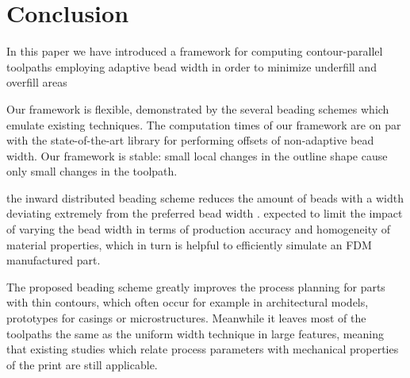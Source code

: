 \section{Conclusion}
In this paper we have introduced a framework for computing contour-parallel toolpaths employing adaptive bead width in order to minimize underfill and overfill areas

Our framework is flexible, demonstrated by the several beading schemes which emulate existing techniques.
The computation times of our framework are on par with the state-of-the-art library for performing offsets of non-adaptive bead width.
Our framework is stable: small local changes in the outline shape cause only small changes in the toolpath.

 the inward distributed beading scheme
 reduces the amount of beads with a width deviating extremely from the preferred bead width .
 expected to limit the impact of varying the bead width in terms of production accuracy and homogeneity of material properties,
which in turn is helpful to efficiently simulate an FDM manufactured part.

The proposed beading scheme greatly improves the process planning for parts with thin contours, which often occur for example in architectural models, prototypes for casings or microstructures.
Meanwhile it leaves most of the toolpaths the same as the uniform width technique in large features, meaning that existing studies which relate process parameters with mechanical properties of the print are still applicable.

